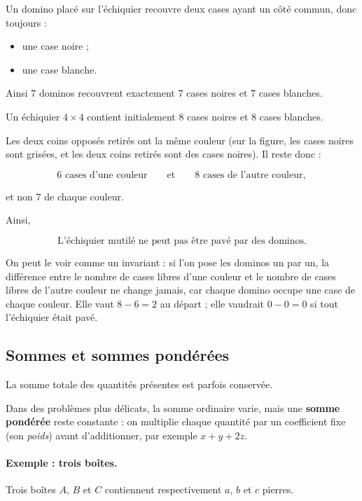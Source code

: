 Un domino placé sur l'échiquier recouvre deux cases ayant un côté commun,
donc toujours :

\begin{itemize}
    \item une case noire ;
    \item une case blanche.
\end{itemize}

Ainsi \(7\) dominos recouvrent exactement \(7\) cases noires et \(7\) cases
blanches.

Un échiquier \(4\times4\) contient initialement \(8\) cases noires et
\(8\) cases blanches.

Les deux coins opposés retirés ont la même couleur (sur la figure, les cases
noires sont grisées, et les deux coins retirés sont des cases noires). Il reste donc :

\[
6\text{ cases d'une couleur}
\qquad\text{et}\qquad
8\text{ cases de l'autre couleur},
\]

et non \(7\) de chaque couleur.

Ainsi,

\[
\boxed{
\text{L'échiquier mutilé ne peut pas être pavé par des dominos.}
}
\]

On peut le voir comme un invariant : si l'on pose les dominos un par un, la
différence entre le nombre de cases libres d'une couleur et le nombre de cases
libres de l'autre couleur ne change jamais, car chaque domino occupe une case
de chaque couleur. Elle vaut \(8-6=2\) au départ ; elle vaudrait \(0-0=0\) si
tout l'échiquier était pavé.

\subsection{Sommes et sommes pondérées}

La somme totale des quantités présentes est parfois conservée.

Dans des problèmes plus délicats, la somme ordinaire varie, mais une
\textbf{somme pondérée} reste constante : on multiplie chaque quantité par un
coefficient fixe (son \emph{poids}) avant d'additionner, par exemple
\(x+y+2z\).

\paragraph{Exemple : trois boîtes.}

Trois boîtes \(A\), \(B\) et \(C\) contiennent respectivement \(a\), \(b\) et
\(c\) pierres.

